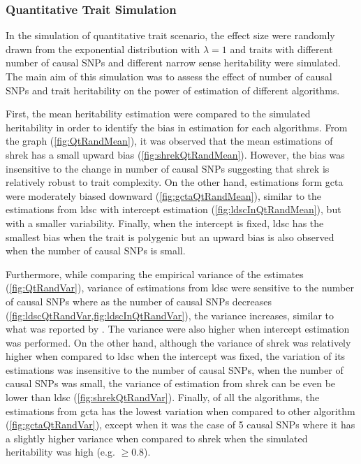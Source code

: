 		\subsubsection{Quantitative Trait Simulation}
		 
		In the simulation of quantitative trait scenario, the effect size were randomly drawn from the exponential distribution with $\lambda=1$ and traits with different number of causal \glspl{SNP} and different narrow sense heritability were simulated.
		The main aim of this simulation was to assess the effect of number of causal \glspl{SNP} and trait heritability on the power of estimation of different algorithms.
		
		First, the mean heritability estimation were compared to the simulated heritability in order to identify the bias in estimation for each algorithms.
		From the graph (\cref{fig:QtRandMean}), it was observed that the mean estimations of \gls{shrek} has a small upward bias (\cref{fig:shrekQtRandMean}).
		However, the bias was insensitive to the change in number of causal \glspl{SNP} suggesting that \gls{shrek} is relatively robust to trait complexity.
		On the other hand, estimations form \gls{gcta} were moderately biased downward (\cref{fig:gctaQtRandMean}), similar to the estimations from \gls{ldsc} with intercept estimation (\cref{fig:ldscInQtRandMean}), but with a smaller variability.
		Finally, when the intercept is fixed, \gls{ldsc} has the smallest bias when the trait is polygenic but an upward bias is also observed when the number of causal \glspl{SNP} is small.
		
		
		Furthermore, while comparing the empirical variance of the estimates (\cref{fig:QtRandVar}), variance of estimations from \gls{ldsc} were sensitive to the number of causal \glspl{SNP} where as the number of causal \glspl{SNP} decreases (\cref{fig:ldscQtRandVar,fig:ldscInQtRandVar}), the variance increases, similar to what was reported by \citet{Bulik-Sullivan2015}.
		The variance were also higher when intercept estimation was performed. 
		On the other hand, although the variance of \gls{shrek} was relatively higher when compared to \gls{ldsc} when the intercept was fixed, the variation of its estimations was insensitive to the number of causal \glspl{SNP}, when the number of causal \glspl{SNP} was small, the variance of estimation from \gls{shrek} can be even be lower than \gls{ldsc} (\cref{fig:shrekQtRandVar}).
		Finally, of all the algorithms, the estimations from \gls{gcta} has the lowest variation when compared to other algorithm (\cref{fig:gctaQtRandVar}), except when it was the case of 5 causal \glspl{SNP} where it has a slightly higher variance when compared to \gls{shrek} when the simulated heritability was high (e.g. $\ge 0.8$).
		

